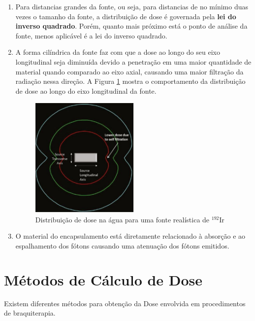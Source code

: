 \documentclass[11pt,a4paper]{article}
\begin{document}
		\begin{enumerate}
			\item Para distancias grandes da fonte, ou seja, para distancias de no mínimo duas vezes o tamanho da fonte, a distribuição de dose é governada pela \textbf{\textcolor{CarnationPink}{lei do inverso quadrado}}. Porém, quanto mais próximo está o ponto de análise da fonte, menos aplicável é a lei do inverso quadrado.
			
			\item A forma cilíndrica da fonte faz com que a dose ao longo do seu eixo longitudinal seja diminuída devido a penetração em uma maior quantidade de material quando comparado ao eixo axial, causando uma maior filtração da radiação nessa direção. A Figura \ref{img:distribuicaoDeDose} mostra o comportamento da distribuição de dose ao longo do eixo longitudinal da fonte.
			
				\begin{figure}[h]
					\centering
					\includegraphics[width=0.5\textwidth]{Imagens/distribuicaoDeDose.JPG}
					\caption{Distribuição de dose na água para uma fonte realística de $\mathrm{{}^{192}Ir}$}
					\label{img:distribuicaoDeDose}
				\end{figure}

			\item O material do encapsulamento está diretamente relacionado à absorção e ao espalhamento dos fótons causando uma atenuação dos fótons emitidos.
		\end{enumerate}
	
	\section{Métodos de Cálculo de Dose}

		Existem diferentes métodos para obtenção da Dose envolvida em procedimentos de braquiterapia. 
\end{document}

